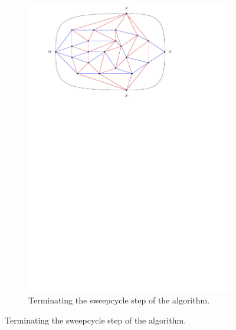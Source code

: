 \begin{figure}
    \centering
    \ContinuedFloat
    \begin{subfigure}[b]{.9 \textwidth}
      \includegraphics[width=\textwidth]{examples/img/smallExample/smallExample-7}
      \caption{Terminating the sweepcycle step of the algorithm.}
      \label{fig:ex:simple:7}
    \end{subfigure}
    

\end{figure}
